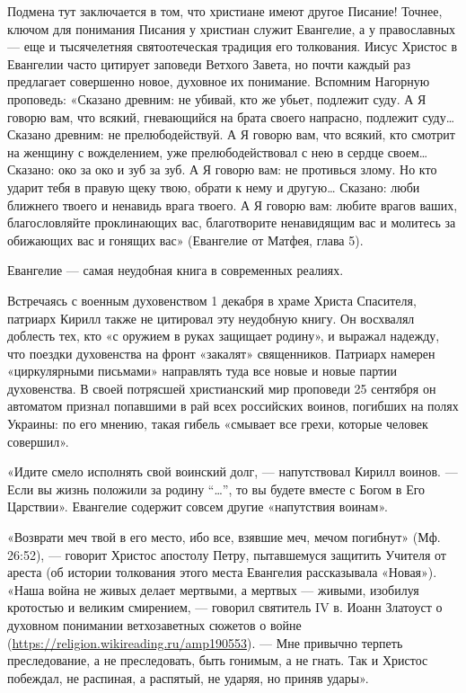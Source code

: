 Подмена тут заключается в том, что христиане имеют другое Писание! Точнее, ключом для понимания Писания у христиан служит Евангелие, а у православных — еще и тысячелетняя святоотеческая традиция его толкования. Иисус Христос в Евангелии часто цитирует заповеди Ветхого Завета, но почти каждый раз предлагает совершенно новое, духовное их понимание. Вспомним Нагорную проповедь: «Сказано древним: не убивай, кто же убьет, подлежит суду. А Я говорю вам, что всякий, гневающийся на брата своего напрасно, подлежит суду… Сказано древним: не прелюбодействуй. А Я говорю вам, что всякий, кто смотрит на женщину с вожделением, уже прелюбодействовал с нею в сердце своем… Сказано: око за око и зуб за зуб. А Я говорю вам: не противься злому. Но кто ударит тебя в правую щеку твою, обрати к нему и другую… Сказано: люби ближнего твоего и ненавидь врага твоего. А Я говорю вам: любите врагов ваших, благословляйте проклинающих вас, благотворите ненавидящим вас и молитесь за обижающих вас и гонящих вас» (Евангелие от Матфея, глава 5).


\begin{fancyquotes}
    Евангелие — самая неудобная книга в современных реалиях.
\end{fancyquotes}

Встречаясь с военным духовенством 1 декабря в храме Христа Спасителя, патриарх Кирилл также не цитировал эту неудобную книгу. Он восхвалял доблесть тех, кто «с оружием в руках защищает родину», и выражал надежду, что поездки духовенства на фронт «закалят» священников. Патриарх намерен «циркулярными письмами» направлять туда все новые и новые партии духовенства. В своей потрясшей христианский мир проповеди 25 сентября он автоматом признал попавшими в рай всех российских воинов, погибших на полях Украины: по его мнению, такая гибель «смывает все грехи, которые человек совершил».

\begin{fancyquotes}
    «Идите смело исполнять свой воинский долг, — напутствовал Кирилл воинов. — Если вы жизнь положили за родину ``\dots'', то вы будете вместе с Богом в Его Царствии».
    Евангелие содержит совсем другие «напутствия воинам».
\end{fancyquotes}

«Возврати меч твой в его место, ибо все, взявшие меч, мечом погибнут» (Мф. 26:52), — говорит Христос апостолу Петру, пытавшемуся защитить Учителя от ареста (об истории толкования этого места Евангелия рассказывала «Новая»). «Наша война не живых делает мертвыми, а мертвых — живыми, изобилуя кротостью и великим смирением, — говорил святитель IV в. Иоанн Златоуст о духовном понимании ветхозаветных сюжетов о войне (\url{https://religion.wikireading.ru/amp190553}). — Мне привычно терпеть преследование, а не преследовать, быть гонимым, а не гнать. Так и Христос побеждал, не распиная, а распятый, не ударяя, но приняв удары».

